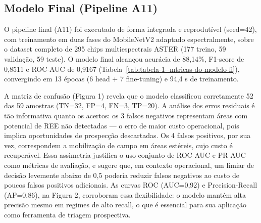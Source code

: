 \documentclass[12pt,twocolumn]{article}
\begin{document}
\subsection{Modelo Final (Pipeline A11)}\label{modelo-final-pipeline-a11}

O pipeline final (A11) foi executado de forma integrada e reprodutível (seed=42), com treinamento em duas fases do MobileNetV2 adaptado espectralmente, sobre o dataset completo de 295 chips multiespectrais ASTER (177 treino, 59 validação, 59 teste). O modelo final alcançou acurácia de 88,14\%, F1-score de 0,8511 e ROC-AUC de 0,9167 (Tabela~\ref{tab:tabela-1--mtricas-do-modelo-fi}), convergindo em 13 épocas (6 head + 7 fine-tuning) e 94,4 s de treinamento.

\begin{table}[H]
\vspace{-6pt}
\centering
\caption{Métricas do modelo final (A11) no conjunto de teste. Fonte: Autores (2026)}
\label{tab:tabela-1--mtricas-do-modelo-fi}
\vspace{-6pt}
\end{table}

A matriz de confusão (Figura 1) revela que o modelo classificou corretamente 52 das 59 amostras (TN=32, FP=4, FN=3, TP=20). A análise dos erros residuais é tão informativa quanto os acertos: os 3 falsos negativos representam áreas com potencial de REE não detectadas --- o erro de maior custo operacional, pois implica oportunidades de prospecção descartadas. Os 4 falsos positivos, por sua vez, correspondem a mobilização de campo em áreas estéreis, cujo custo é recuperável. Essa assimetria justifica o uso conjunto de ROC-AUC e PR-AUC como métricas de avaliação, e sugere que, em contexto operacional, um limiar de decisão levemente abaixo de 0,5 poderia reduzir falsos negativos ao custo de poucos falsos positivos adicionais. As curvas ROC (AUC=0,92) e Precision-Recall (AP=0,86), na Figura 2, corroboram essa flexibilidade: o modelo mantém alta precisão mesmo em regimes de alto recall, o que é essencial para sua aplicação como ferramenta de triagem prospectiva.
\end{document}
